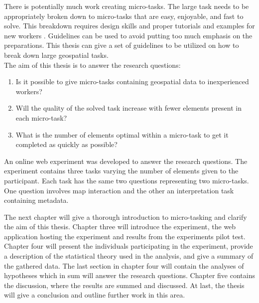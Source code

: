 There is potentially much work creating micro-tasks. The large task needs to be appropriately broken down to micro-tasks that are easy, enjoyable, and fast to solve. This breakdown requires design skills and proper tutorials and examples for new workers \citep{Schulze2012}. 
Guidelines can be used to avoid putting too much emphasis on the preparations. This thesis can give a set of guidelines to be utilized on how to break down large geospatial tasks.\\

The aim of this thesis is to answer the research questions: 
\begin{enumerate}
	\item Is it possible to give micro-tasks containing geospatial data to inexperienced workers?
	\item Will the quality of the solved task increase with fewer elements present in each micro-task?
	\item What is the number of elements optimal within a micro-task to get it completed as quickly as possible?
\end{enumerate}
\vspace{0.3cm}
An online web experiment was developed to answer the research questions. The experiment contains three tasks varying the number of elements given to the participant. Each task has the same two questions representing two micro-tasks. One question involves map interaction and the other an interpretation task containing metadata. 

The next chapter will give a thorough introduction to micro-tasking and clarify the aim of this thesis. Chapter three will introduce the experiment, the web application hosting the experiment and results from the experiments pilot test. Chapter four will present the individuals participating in the experiment, provide a description of the statistical theory used in the analysis, and give a summary of the gathered data. The last section in chapter four will contain the analyses of hypotheses which in sum will answer the research questions. Chapter five contains the discussion, where the results are summed and discussed. At last, the thesis will give a conclusion and outline further work in this area.
 
